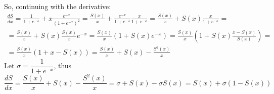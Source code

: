 So, continuing with the derivative:
\[
\begin{gathered}
\frac{dS}{dx} = \frac{1}{1+e^{-x}} + x \frac{e^{-x}}{\left( 1 + e^{-x} \right)^2} = \frac{S(x)}{x} + \frac{e^{-x}}{1+e^{-x}} \frac{x}{1+e^{-x}} = \frac{S(x)}{x} + S(x) \frac{x}{1+e^{-x}} = \\ 
= \frac{S(x)}{x} + S(x) \frac{S(x)}{x} e^{-x} = \frac{S(x)}{x} \left( 1 + S(x) e^{-x} \right) = \frac{S(x)}{x} \left( 1 + S(x)\frac{x-S(x)}{S(x)} \right) = \\
= \frac{S(x)}{x} \left( 1 + x - S(x) \right) = \frac{S(x)}{x} + S(x) - \frac{S^2(x)}{x}
\end{gathered}
\]
Let $\sigma = \dfrac{1}{1 + e^{-x}}$, thus 
\[
\frac{dS}{dx} = \frac{S(x)}{x} + S(x) - \frac{S^2(x)}{x} = \sigma + S(x) - \sigma S(x) = S(x) + \sigma \left( 1 - S(x) \right)
\]